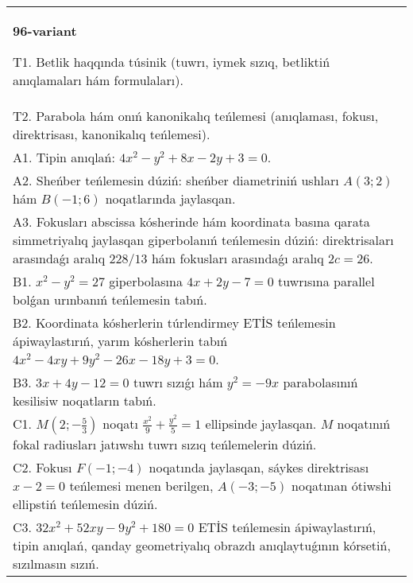 \documentclass{article}
\begin{document}
\begin{tabular}{m{17cm}}
\textbf{96-variant}
\newline

T1. Betlik haqqında túsinik (tuwrı, iymek sızıq, betliktiń anıqlamaları hám formulaları).\\

T2. Parabola hám onıń kanonikalıq teńlemesi (anıqlaması, fokusı, direktrisası, kanonikalıq teńlemesi).\\

A1. Tipin anıqlań: $4 x^{2}-y^{2}+8 x-2 y+3=0$.\\

A2. Sheńber teńlemesin dúziń: sheńber diametriniń ushları $A (3;2) $ hám $B (-1;6 ) $ noqatlarında jaylasqan.\\

A3. Fokusları abscissa kósherinde hám koordinata basına qarata simmetriyalıq jaylasqan giperbolanıń teńlemesin dúziń: direktrisaları arasındaǵı aralıq $228/13$ hám fokusları arasındaǵı aralıq $2 c=26$.\\

B1. $x^{2} - y^{2} = 27$ giperbolasına $4x + 2y - 7 = 0$ tuwrısına parallel bolǵan urınbanıń teńlemesin tabıń.  \\

B2. Koordinata kósherlerin túrlendirmey ETİS teńlemesin ápiwaylastırıń, yarım kósherlerin tabıń $4x^{2} - 4xy + 9y^{2} - 26x - 18y + 3 = 0$.\\

B3. $3x + 4y - 12 = 0$ tuwrı sızıǵı hám $y^{2} = - 9x$ parabolasınıń kesilisiw noqatların tabıń.  \\

C1. $M(2; - \frac{5}{3})$ noqatı $\frac{x^{2}}{9} + \frac{y^{2}}{5} = 1$ ellipsinde jaylasqan. $M$ noqatınıń fokal radiusları jatıwshı tuwrı sızıq teńlemelerin dúziń.  \\

C2. Fokusı $F( - 1; - 4)$ noqatında jaylasqan, sáykes direktrisası $x - 2 = 0$ teńlemesi menen berilgen, $A( - 3; - 5)$ noqatınan ótiwshi ellipstiń teńlemesin dúziń.  \\

C3. $32x^{2} + 52xy - 9y^{2} + 180 = 0$ ETİS teńlemesin ápiwaylastırıń, tipin anıqlań, qanday geometriyalıq obrazdı anıqlaytuǵının kórsetiń, sızılmasın sızıń.  \\

\end{tabular}
\vspace{1cm}
\end{document}
